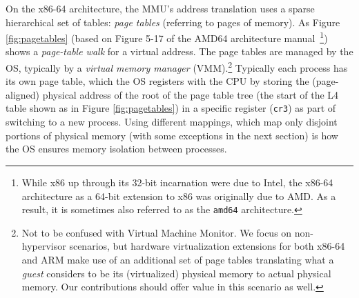 On the x86-64 architecture, the \textsc{MMU}'s address translation uses a sparse hierarchical set of tables:
\emph{page tables} (referring to pages of memory). As Figure \ref{fig:pagetables} (based on Figure 5-17 of the 
AMD64 architecture manual~\cite{amd64_manual_vol2}\footnote{While x86 up through its 32-bit incarnation were due to Intel,
the x86-64 architecture as a 64-bit extension to x86 was originally due to AMD. As a result, it is sometimes also referred to as the \texttt{amd64} architecture.}) shows a \emph{page-table walk} for a virtual address. The page tables are managed by the OS, typically by a \emph{virtual memory manager} (VMM).\footnote{Not to be confused with Virtual 
Machine Monitor. We focus on non-hypervisor scenarios, but hardware virtualization extensions for both 
x86-64 and ARM make use of an additional set of page tables translating what a \emph{guest} considers to be its 
(virtualized) physical memory to actual physical memory. Our contributions should offer value in this scenario as well.}
Typically each process has its own 
page table, which the OS registers with the CPU by storing the (page-aligned)
physical address of the root of the page table tree (the start of the L4 table shown as  in Figure \ref{fig:pagetables}) in a specific register (\texttt{cr3}) as part of switching to a new process. 
Using different mappings, which map only disjoint portions of physical memory (with some exceptions in the next section) 
is how the OS ensures memory isolation between processes.

